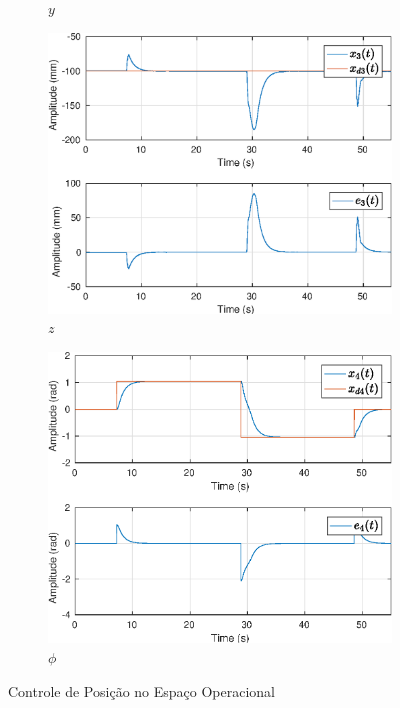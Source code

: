 \begin{figure}[H]
\begin{subfigure}{.5\textwidth}
  \caption{$y$}
  \label{fig:sub2}
\end{subfigure}
\begin{subfigure}{.5\textwidth}
  \centering
  \includegraphics[width=\linewidth]{./img/position2/x3.eps}
  \caption{$z$}
  \label{fig:sub1}
\end{subfigure}%
\begin{subfigure}{.5\textwidth}
  \centering
  \includegraphics[width=\linewidth]{./img/position2/x4.eps}
  \caption{$\phi$}
  \label{fig:pos_exp2_phi}
\end{subfigure}
\caption{Controle de Posição no Espaço Operacional}
\label{fig:test}
\end{figure}

